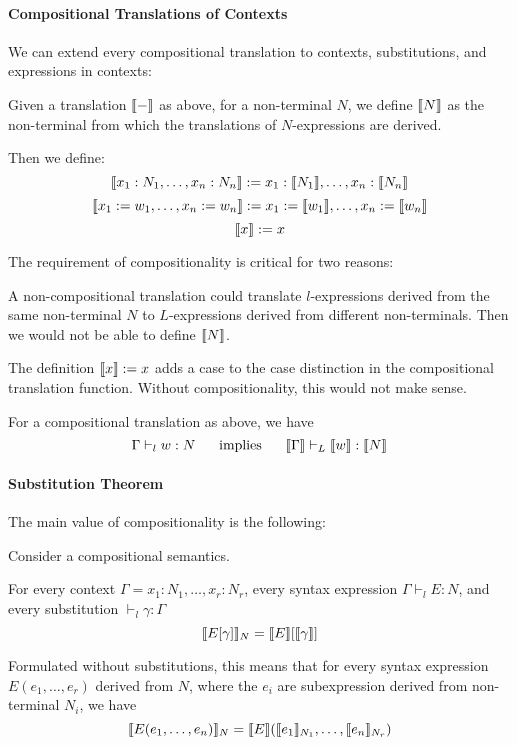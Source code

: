 \paragraph{Compositional Translations of Contexts}
We can extend every compositional translation to contexts, substitutions, and expressions in contexts:

\begin{definition}
Given a translation $\llbracket -\rrbracket$ as above, for a non-terminal $N$, we define $\llbracket N\rrbracket$ as the non-terminal from which the translations of $N$-expressions are derived.

Then we define:
\[\llbracket x_1:N_1,\ldots,x_n:N_n\rrbracket:=x_1:\llbracket N_1\rrbracket,\ldots,x_n:\llbracket N_n\rrbracket\]
\[\llbracket x_1:=w_1,\ldots,x_n:=w_n\rrbracket:=x_1:=\llbracket w_1\rrbracket,\ldots,x_n:=\llbracket w_n\rrbracket\]
\[\llbracket x\rrbracket:=x\]
\end{definition}

The requirement of compositionality is critical for two reasons:
\begin{compactitem}
\item A non-compositional translation could translate $l$-expressions derived from the same non-terminal $N$ to $L$-expressions derived from different non-terminals. Then we would not be able to define $\llbracket N\rrbracket$.
\item The definition $\llbracket x\rrbracket:=x$ adds a case to the case distinction in the compositional translation function.
Without compositionality, this would not make sense.
\end{compactitem}

\begin{theorem}
For a compositional translation as above, we have
  \[\Gamma\vdash_l w:N \hspace*{.5cm}\;\mathrm{implies}\;\hspace*{.5cm} \llbracket \Gamma\rrbracket\vdash_L \llbracket w\rrbracket:\llbracket N\rrbracket\]
\end{theorem}

\paragraph{Substitution Theorem}
The main value of compositionality is the following:
\begin{theorem}
Consider a compositional semantics.

For every context $\Gamma=x_1:N_1,\ldots,x_r:N_r$, every syntax expression $\Gamma \vdash_l E:N$,
and every substitution $\vdash_l \gamma:\Gamma$
\[\llbracket E[\gamma]\rrbracket_N=\llbracket E\rrbracket[\llbracket \gamma\rrbracket]\]
\end{theorem}

Formulated without substitutions, this means that for every syntax expression $E(e_1,\ldots,e_r)$ derived from $N$, where the $e_i$ are subexpression derived from non-terminal $N_i$, we have
\[\llbracket E(e_1,\ldots,e_n)\rrbracket_N=\llbracket E\rrbracket(\llbracket e_1\rrbracket_{N_1},\ldots,\llbracket e_n\rrbracket_{N_r})\]

